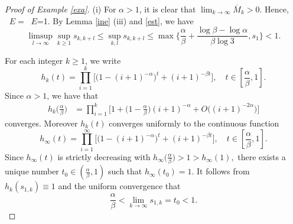 \documentclass[12pt]{amsart}
\numberwithin{equation}{section}
\theoremstyle{plain}
\theoremstyle{remark}
\theoremstyle{definition}
\newcommand{\om}{\overline{M}}
\newcommand{\f}{\frac}
\renewcommand{\ge}{\geqslant}
\renewcommand{\le}{\leqslant}
\renewcommand{\geq}{\geqslant}
\DeclareMathOperator{\dima}{dim_A}
\DeclareMathOperator{\dimqa}{dim_{qA}}
\begin{document}
\begin{proof}[Proof of Example \ref{exa}]
		
		(i)	For $\alpha>1$, it is  clear  that $\lim_{k\to\infty}\om_k>0$. Hence, $\dimqa E=\dima E$=1. By Lemma \ref{ine} (iii) and \eqref{est}, we have
		\[
		\limsup_{l\to\infty}\sup_{k\ge 1} s_{k,k+l}\le\sup_{k,l}s_{k,k+l}\le \max\Big\{\f\alpha\beta+\f{\log\beta-\log\alpha}{\beta\log 3},s_{1}\Big\}<1.
		\]
		
		For each integer $k\geq 1$, we write
		\[
		h_k(t)=\prod_{i=1}^k\Big[\big(1- (i+1)^{-\alpha}\big)^t+(i+1)^{-\beta t}\Big],\quad t\in [\f\alpha\beta,1 ].
		\] 
		Since  $\alpha>1$, we have that  
		\begin{align*}
			h_k\big(\f\alpha\beta\big)
			&=\prod_{i=1}^k\Big[1+\big(1-\f\alpha\beta\big)(i+1)^{-\alpha}+O\big({(i+1)^{-2\alpha}}\big)\Big]
		\end{align*}
		converges.  Moreover $h_k(t)$ converges uniformly to the  continuous function 
		\[
		h_\infty(t)=\prod_{i=1}^\infty\Big[\big(1-(i+1)^{-\alpha}\big)^t+ (i+1)^{-\beta t}\Big],\quad t\in  [\f\alpha\beta,1].
		\]
		Since $h_\infty(t)$ is strictly decreasing with $h_\infty\big(\f\alpha\beta\big)>1>h_\infty(1),$
		 there exists a unique number $t_0\in (\f\alpha\beta,1 )$ such that $h_\infty(t_0)=1$. It follows from $h_k(s_{1,k})\equiv 1$ and the uniform convergence that
		\[
		\frac\alpha\beta<\lim_{k\to\infty} s_{1,k}=t_0<1.
		\]
		

\end{proof}
\end{document}

